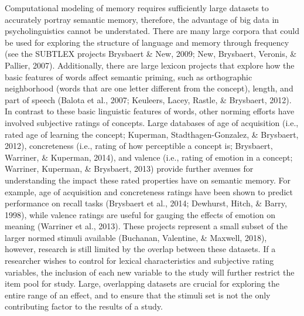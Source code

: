 \documentclass[english,,man]{apa6}
\theoremstyle{definition}
\theoremstyle{definition}
\theoremstyle{definition}
\theoremstyle{remark}
\begin{document}
Computational modeling of memory requires sufficiently large datasets to
accurately portray semantic memory, therefore, the advantage of big data
in psycholinguistics cannot be understated. There are many large corpora
that could be used for exploring the structure of language and memory
through frequency (see the SUBTLEX projects Brysbaert \& New, 2009; New,
Brysbaert, Veronis, \& Pallier, 2007). Additionally, there are large
lexicon projects that explore how the basic features of words affect
semantic priming, such as orthographic neighborhood (words that are one
letter different from the concept), length, and part of speech (Balota
et al., 2007; Keuleers, Lacey, Rastle, \& Brysbaert, 2012). In contrast
to these basic linguistic features of words, other norming efforts have
involved subjective ratings of concepts. Large databases of age of
acquisition (i.e., rated age of learning the concept; Kuperman,
Stadthagen-Gonzalez, \& Brysbaert, 2012), concreteness (i.e., rating of
how perceptible a concept is; Brysbaert, Warriner, \& Kuperman, 2014),
and valence (i.e., rating of emotion in a concept; Warriner, Kuperman,
\& Brysbaert, 2013) provide further avenues for understanding the impact
these rated properties have on semantic memory. For example, age of
acquisition and concreteness ratings have been shown to predict
performance on recall tasks (Brysbaert et al., 2014; Dewhurst, Hitch, \&
Barry, 1998), while valence ratings are useful for gauging the effects
of emotion on meaning (Warriner et al., 2013). These projects represent
a small subset of the larger normed stimuli available (Buchanan,
Valentine, \& Maxwell, 2018), however, research is still limited by the
overlap between these datasets. If a researcher wishes to control for
lexical characteristics and subjective rating variables, the inclusion
of each new variable to the study will further restrict the item pool
for study. Large, overlapping datasets are crucial for exploring the
entire range of an effect, and to ensure that the stimuli set is not the
only contributing factor to the results of a study.
\end{document}
